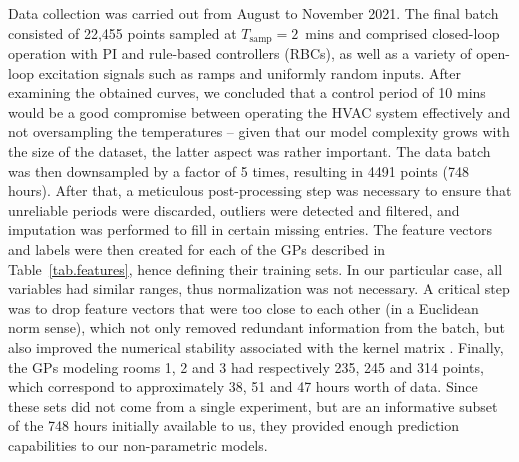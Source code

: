 Data collection was carried out from August to November 2021. The final batch consisted of 22,455 points sampled at $T_\text{samp} = 2\,$ mins and comprised closed-loop operation with PI and rule-based controllers (RBCs), as well as a variety of open-loop excitation signals such as ramps and uniformly random inputs. After examining the obtained curves, we concluded that a control period of 10 mins would be a good compromise between operating the HVAC system effectively and not oversampling the temperatures -- given that our model complexity grows with the size of the dataset, the latter aspect was rather important. The data batch was then downsampled by a factor of 5 times, resulting in 4491 points (748 hours). After that, a meticulous post-processing step was necessary to ensure that unreliable periods were discarded, outliers were detected and filtered, and imputation was performed to fill in certain missing entries. The feature vectors and labels were then created for each of the GPs described in Table~\ref{tab.features}, hence defining their training sets. In our particular case, all variables had similar ranges, thus normalization was not necessary. A critical step was to drop feature vectors that were too close to each other (in a Euclidean norm sense), which not only removed redundant information from the batch, but also improved the numerical stability associated with the kernel matrix \cite{williams2006gaussian}. Finally, the GPs modeling rooms 1, 2 and 3 had respectively 235, 245 and 314 points, which correspond to approximately 38, 51 and 47 hours worth of data. Since these sets did not come from a single experiment, but are an informative subset of the 748 hours initially available to us, they provided enough prediction capabilities to our non-parametric models.

